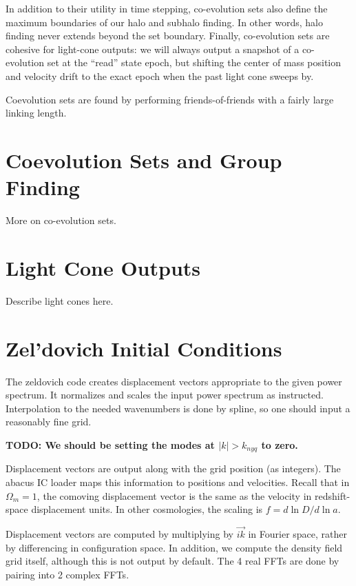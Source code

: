 \documentclass[11pt,preprint]{aastex}
\newcommand{\todo}[1]{{\bf TODO: #1}}
\begin{document}
In addition to their utility in time stepping, co-evolution sets
also define the maximum boundaries of our halo and subhalo finding.
In other words, halo finding never extends beyond the set boundary.
Finally, co-evolution sets are cohesive for light-cone outputs: we
will always output a snapshot of a co-evolution set at the ``read''
state epoch, but shifting the center of mass position and velocity
drift to the exact epoch when the past light cone sweeps by.

Coevolution sets are found by performing friends-of-friends with a
fairly large linking length.

\section{Coevolution Sets and Group Finding}

More on co-evolution sets.

\section{Light Cone Outputs}

Describe light cones here.

\section{Zel'dovich Initial Conditions}

The zeldovich code creates displacement vectors appropriate to 
the given power spectrum.  It normalizes and scales the input
power spectrum as instructed.  Interpolation to the needed wavenumbers
is done by spline, so one should input a reasonably fine grid.

\todo{We should be setting the modes at $|k|>k_{nyq}$ to zero.}

Displacement vectors are output along with the grid position (as
integers).  The abacus IC loader maps this information to positions
and velocities.  Recall that in $\Omega_m=1$, the comoving displacement
vector is the same as the velocity in redshift-space displacement
units.  In other cosmologies, the scaling is $f = d\ln D/d\ln a$.

Displacement vectors are computed by multiplying by $\vec{ik}$ in
Fourier space, rather by differencing in configuration space.  In
addition, we compute the density field grid itself, although this
is not output by default.  The 4 real FFTs are done by pairing into
2 complex FFTs.
\end{document}
